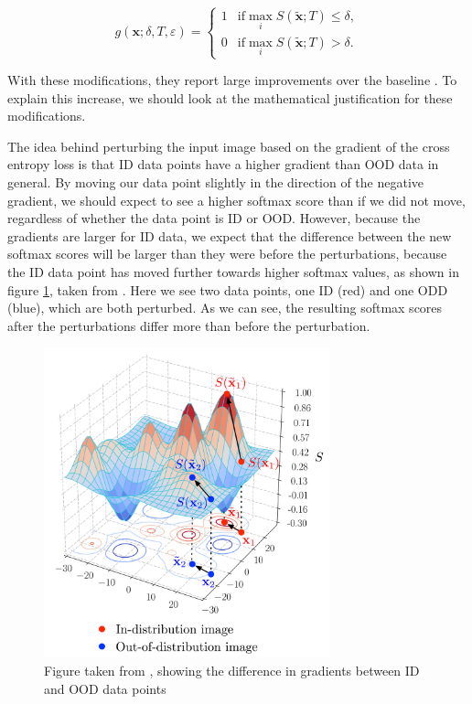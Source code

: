 \documentclass[conference,onecolumn]{IEEEtran}
\begin{document}
\begin{equation}
g(\bm{x};\delta,T,\varepsilon)=\left\{\begin{matrix}1&\text{if} \max_{i}S(\tilde{\bm{x}};T)\le\delta,\\ 0&\text{if} \max_{i}S(\tilde{\bm{x}};T)>\delta. \end{matrix}\right.
\label{fullodin}
\end{equation}

With these modifications, they report large improvements over the baseline \cite[4]{odin}. To explain this increase, we should look at the mathematical justification for these modifications.

The idea behind perturbing the input image based on the gradient of the cross entropy loss is that ID data points have a higher gradient than OOD data in general. By moving our data point slightly in the direction of the negative gradient, we should expect to see a higher softmax score than if we did not move, regardless of whether the data point is ID or OOD. However, because the gradients are larger for ID data, we expect that the difference between the new softmax scores will be larger than they were before the perturbations, because the ID data point has moved further towards higher softmax values, as shown in figure \ref{softmaxmove}, taken from \cite[8]{odin}. Here we see two data points, one ID (red) and one ODD (blue), which are both perturbed. As we can see, the resulting softmax scores after the perturbations differ more than before the perturbation.

\begin{figure}[h]
\centerline{\includegraphics[width=3.25in]{figure/gradient.png}}
\caption{Figure taken from \cite{odin}, showing the difference in gradients between ID and OOD data points}
\label{softmaxmove}
\end{figure}
\end{document}
